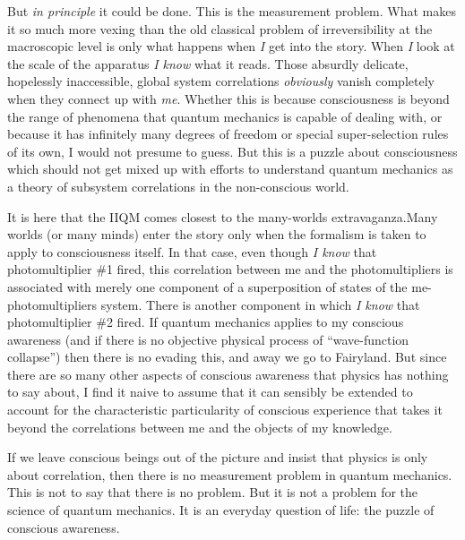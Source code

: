 But {\it in principle\/} it could be done.  This is the measurement
problem.  What makes it so much more vexing than the old classical problem of
irreversibility at the macroscopic level is only what happens when {\it
I\/} get into the story.  When {\it I\/} look at the scale of the
apparatus {\it I know\/} what it reads.  Those absurdly delicate,
hopelessly inaccessible, global system correlations {\it obviously\/}
vanish completely when they connect up with {\it me\/}.  Whether this
is because consciousness is beyond the range of phenomena that quantum
mechanics is capable of dealing with, or because it has infinitely
many degrees of freedom or special super-selection rules of its own, I
would not presume to guess.  But this is a puzzle about consciousness
which should not get mixed up with efforts to understand quantum
mechanics as a theory of subsystem correlations in the non-conscious
world.

It is here that the IIQM comes closest to the many-worlds
extravaganza.\fn Many worlds (or many minds) enter the story only when
the formalism is taken to apply to consciousness itself.  In that case,
even though {\it I know\/} that photomultiplier \#1 fired, this
correlation between me and the photomultipliers is associated with
merely one component of a superposition of states of the
me-photomultipliers system.  There is another component in which {\it
I know\/} that photomultiplier \#2 fired.  If quantum mechanics
applies to my conscious awareness (and if there is no objective
physical process of ``wave-function collapse'') then there is no
evading this, and away we go to Fairyland.  But since there are so
many other aspects of conscious awareness that physics has nothing to
say about, I find it naive to assume that it can sensibly be extended
to account for the characteristic particularity of conscious
experience that takes it beyond the correlations between me and the
objects of my knowledge.  

If we leave conscious beings out of the picture and insist that
physics is only about correlation, then there is no measurement
problem in quantum mechanics.  This is not to say that there is no
problem.  But it is not a problem for the science of quantum
mechanics.  It is an everyday question of life: the puzzle of
conscious awareness.

\bigskip
{}
\medskip 

